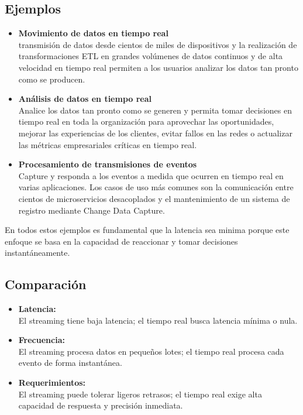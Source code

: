 \documentclass[12pt]{article}
\begin{document}
\subsection{Ejemplos}

\begin{itemize}
    \item \textbf{Movimiento de datos en tiempo real}\\
    transmisión de datos desde cientos de miles de dispositivos y la realización de transformaciones ETL en grandes volúmenes de datos 
    continuos y de alta velocidad en tiempo real permiten a los usuarios analizar los datos tan pronto como se producen.
    \item \textbf{Análisis de datos en tiempo real}\\
    Analice los datos tan pronto como se generen y permita tomar decisiones en tiempo real en toda la organización para aprovechar las 
    oportunidades, mejorar las experiencias de los clientes, evitar fallos en las redes o actualizar las métricas empresariales críticas en 
    tiempo real.
    \item \textbf{Procesamiento de transmisiones de eventos}\\
    Capture y responda a los eventos a medida que ocurren en tiempo real en varias aplicaciones. Los casos de uso más comunes son la 
    comunicación entre cientos de microservicios desacoplados y el mantenimiento de un sistema de registro mediante Change Data Capture. 
\end{itemize}

En todos estos ejemplos es fundamental que la latencia sea minima porque este enfoque se basa en la capacidad de reaccionar y tomar decisiones 
instantáneamente.

\subsection{Comparación}

\begin{itemize}
    \item \textbf{Latencia:}\\
    El streaming tiene baja latencia; el tiempo real busca latencia mínima o nula.
    \item \textbf{Frecuencia:}\\
    El streaming procesa datos en pequeños lotes; el tiempo real procesa cada evento de forma instantánea.
    \item \textbf{Requerimientos:}\\
    El streaming puede tolerar ligeros retrasos; el tiempo real exige alta capacidad de respuesta y precisión inmediata.
\end{itemize}
\end{document}
